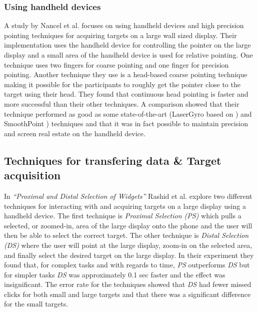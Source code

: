 \subsubsection{Using handheld devices} \label{sec:midAirPointingHandheld}
A study by Nancel et al. \cite{Nancel:2013} focuses on using handheld devices and high precision pointing techniques for acquiring targets on a large wall sized display.
Their implementation uses the handheld device for controlling the pointer on the large display and a small area of the handheld device is used for relative pointing.
One technique uses two fingers for coarse pointing and one finger for precision pointing. 
Another technique they use is a head-based coarse pointing technique making it possible for the participants to roughly get the pointer close to the target using their head.
They found that continuous head pointing is faster and more successful than their other techniques.
A comparison showed that their technique performed as good as some state-of-the-art (LaserGyro based on \cite{Vogel:2005}) and SmoothPoint \cite{Gallo:2012}) techniques and that it was in fact possible to maintain precision and screen real estate on the handheld device.

\subsection{Techniques for transfering data \& Target acquisition} \label{sec:targetAcquisition}
In \emph{``Proximal and Distal Selection of Widgets''} Rashid et al. \cite{Rashid:2011} explore two different techniques for interacting with and acquiring targets on a large display using a handheld device.
The first technique is \emph{Proximal Selection (PS)} which pulls a selected, or zoomed-in, area of the large display onto the phone and the user will then be able to select the correct target.
The other technique is \emph{Distal Selection (DS)} where the user will point at the large display, zoom-in on the selected area, and finally select the desired target on the large display.
In their experiment they found that, for complex tasks and with regards to time, \emph{PS} outperforms \emph{DS} but for simpler tasks \emph{DS} was approximately 0.1 sec faster and the effect was insignificant.
The error rate for the techniques showed that \emph{DS} had fewer missed clicks for both small and large targets and that there was a significant difference for the small targets.

